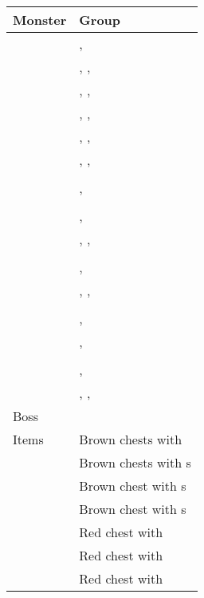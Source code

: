 \noindent\begin{tabularx}{\textwidth}[l]{lX}
	Monster & Group
\\ \hline
	\nameref{monster:basilisk}
	& \nameref{monster:basilisk}, \nameref{monster:basilisk} \\
	& \nameref{monster:basilisk}, \nameref{monster:basilisk}, \nameref{monster:poison_toad} \\
	& \nameref{monster:basilisk}, \nameref{monster:basilisk}, \nameref{monster:basilisk}
\\ \hline
	\nameref{monster:poison_toad}
	& \nameref{monster:poison_toad}, \nameref{monster:poison_toad}, \nameref{monster:mad_plant} \\
	& \nameref{monster:poison_toad}, \nameref{monster:poison_toad}, \nameref{monster:basilisk} \\
	& \nameref{monster:poison_toad}, \nameref{monster:poison_toad}, \nameref{monster:poison_toad}
\\ \hline
	\nameref{monster:sand_worm}
	& \nameref{monster:sand_worm} \\
	& \nameref{monster:sand_worm}, \nameref{monster:sand_worm}
\\ \hline
	\nameref{monster:skeleton}
	& \nameref{monster:skeleton} \\
	& \nameref{monster:skeleton}, \nameref{monster:skeleton} \\
	& \nameref{monster:skeleton}, \nameref{monster:skeleton}, \nameref{monster:skeleton}
\\ \hline
	\nameref{monster:roc}
	& \nameref{monster:roc} \\
	& \nameref{monster:roc}, \nameref{monster:roc} \\
	& \nameref{monster:roc}, \nameref{monster:roc}, \nameref{monster:roc}
\\ \hline
	\nameref{monster:gorgon}
	& \nameref{monster:gorgon} \\
	& \nameref{monster:gorgon}, \nameref{monster:skeleton} \\
	& \nameref{monster:gorgon}, \nameref{monster:sand_worm}
\\ \hline
	\nameref{monster:minotaur_zombie}
	& \nameref{monster:minotaur_zombie} \\
	& \nameref{monster:minotaur_zombie}, \nameref{monster:basilisk} \\
	& \nameref{monster:minotaur_zombie}, \nameref{monster:basilisk}, \nameref{monster:skeleton}
\\ \hline
	Boss & \nameref{monster:flamerus_rex}
\\ \hline
	Items
	& Brown chests with \nameref{weapon:ninja_stars} \\
	& Brown chests with \nameref{item:cure_potion}s \\
	& Brown chest with \nameref{weapon:bomb}s \\
	& Brown chest with \nameref{item:seed}s \\
	& Red chest with \nameref{spell:quake} \\
	& Red chest with \nameref{item:sand_coin} \\
	& Red chest with \nameref{armor:steel_shield}
\end{tabularx}
